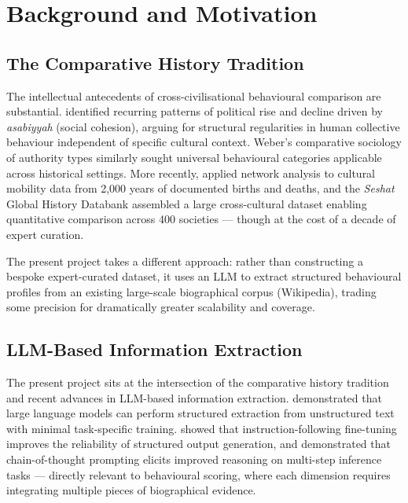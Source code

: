 \documentclass[11pt, a4paper]{report}
\begin{document}
\section{Background and Motivation}

\subsection{The Comparative History Tradition}

The intellectual antecedents of cross-civilisational behavioural comparison are substantial. \citet{khaldun1377} identified recurring patterns of political rise and decline driven by \textit{asabiyyah} (social cohesion), arguing for structural regularities in human collective behaviour independent of specific cultural context. Weber's comparative sociology of authority types \citep{weber1922} similarly sought universal behavioural categories applicable across historical settings. More recently, \citet{schich2014} applied network analysis to cultural mobility data from 2,000 years of documented births and deaths, and the \textit{Seshat} Global History Databank \citep{turchin2018} assembled a large cross-cultural dataset enabling quantitative comparison across 400 societies — though at the cost of a decade of expert curation.

The present project takes a different approach: rather than constructing a bespoke expert-curated dataset, it uses an LLM to extract structured behavioural profiles from an existing large-scale biographical corpus (Wikipedia), trading some precision for dramatically greater scalability and coverage.

\subsection{LLM-Based Information Extraction}

The present project sits at the intersection of the comparative history tradition and recent advances in LLM-based information extraction. \citet{brown2020} demonstrated that large language models can perform structured extraction from unstructured text with minimal task-specific training. \citet{ouyang2022} showed that instruction-following fine-tuning improves the reliability of structured output generation, and \citet{wei2022} demonstrated that chain-of-thought prompting elicits improved reasoning on multi-step inference tasks — directly relevant to behavioural scoring, where each dimension requires integrating multiple pieces of biographical evidence.
\end{document}
